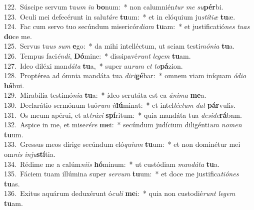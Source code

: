 {122.~}Súscipe servum tu\textit{um} \textit{in} \textbf{bo}num:~* non calumnién\textit{tur} \textit{me} \textit{su}\textbf{pér}bi.\\
{123.~}Oculi mei defecérunt in salu\textit{tá}\textit{re} \textbf{tu}um:~* et in elóquium ju\textit{stí}\textit{ti}\textit{æ} \textbf{tu}æ.\\
{124.~}Fac cum servo tuo secúndum misericór\textit{di}\textit{am} \textbf{tu}am:~* et justificatió\textit{nes} \textit{tu}\textit{as} \textbf{do}ce me.\\
{125.~}Servus tu\textit{us} \textit{sum} \textbf{e}go:~* da mihi intelléctum, ut sciam testi\textit{mó}\textit{ni}\textit{a} \textbf{tu}a.\\
{126.~}Tempus faci\textit{én}\textit{di}, \textbf{Dó}mine:~* dissipavé\textit{runt} \textit{le}\textit{gem} \textbf{tu}am.\\
{127.~}Ideo diléxi man\textit{dá}\textit{ta} \textbf{tu}a,~* super au\textit{rum} \textit{et} \textit{to}\textbf{pá}zion.\\
{128.~}Proptérea ad ómnia mandáta tua \textit{di}\textit{ri}\textbf{gé}bar:~* omnem viam iníquam \textit{ó}\textit{di}\textit{o} \textbf{há}bui.\\
{129.~}Mirabília testimó\textit{ni}\textit{a} \textbf{tu}a:~* ídeo scrutáta est ea \textit{á}\textit{ni}\textit{ma} \textbf{me}a.\\
{130.~}Declarátio sermónum tuó\textit{rum} \textit{il}\textbf{lú}minat:~* et intel\textit{lé}\textit{ctum} \textit{dat} \textbf{pár}vulis.\\
{131.~}Os meum apérui, et at\textit{trá}\textit{xi} \textbf{spí}ritum:~* quia mandáta tua \textit{de}\textit{si}\textit{de}\textbf{rá}bam.\\
{132.~}Aspice in me, et mise\textit{ré}\textit{re} \textbf{me}i:~* secúndum judícium diligénti\textit{um} \textit{no}\textit{men} \textbf{tu}um.\\
{133.~}Gressus meos dírige secúndum eló\textit{qui}\textit{um} \textbf{tu}um:~* et non dominétur mei om\textit{nis} \textit{in}\textit{ju}\textbf{stí}tia.\\
{134.~}Rédime me a calúm\textit{ni}\textit{is} \textbf{hó}minum:~* ut custódiam \textit{man}\textit{dá}\textit{ta} \textbf{tu}a.\\
{135.~}Fáciem tuam illúmina super \textit{ser}\textit{vum} \textbf{tu}um:~* et doce me justifica\textit{ti}\textit{ó}\textit{nes} \textbf{tu}as.\\
{136.~}Exitus aquárum deduxérunt ó\textit{cu}\textit{li} \textbf{me}i:~* quia non custodié\textit{runt} \textit{le}\textit{gem} \textbf{tu}am.\\
